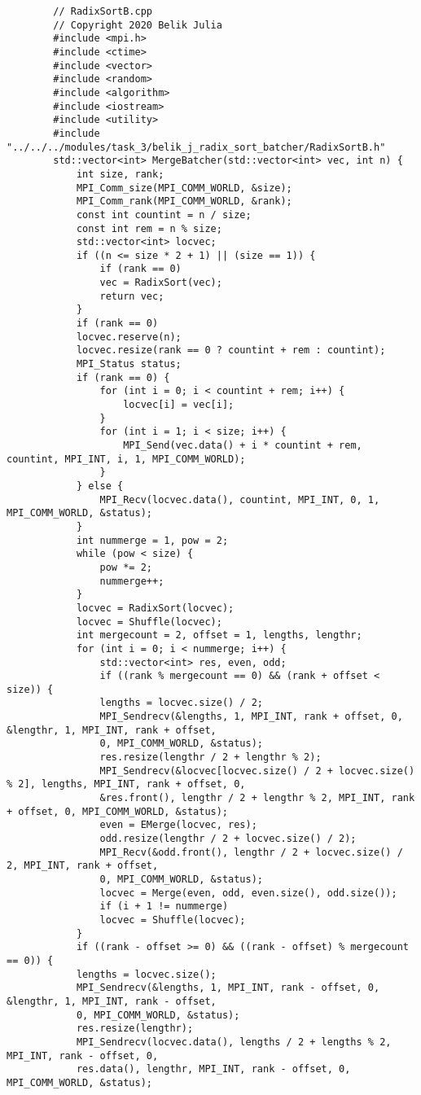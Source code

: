 \documentclass{report}
\begin{document}
	\begin{lstlisting}
		// RadixSortB.cpp
		// Copyright 2020 Belik Julia
		#include <mpi.h>
		#include <ctime>
		#include <vector>
		#include <random>
		#include <algorithm>
		#include <iostream>
		#include <utility>
		#include "../../../modules/task_3/belik_j_radix_sort_batcher/RadixSortB.h"
		std::vector<int> MergeBatcher(std::vector<int> vec, int n) {
			int size, rank;
			MPI_Comm_size(MPI_COMM_WORLD, &size);
			MPI_Comm_rank(MPI_COMM_WORLD, &rank);
			const int countint = n / size;
			const int rem = n % size;
			std::vector<int> locvec;
			if ((n <= size * 2 + 1) || (size == 1)) {
				if (rank == 0)
				vec = RadixSort(vec);
				return vec;
			}
			if (rank == 0)
			locvec.reserve(n);
			locvec.resize(rank == 0 ? countint + rem : countint);
			MPI_Status status;
			if (rank == 0) {
				for (int i = 0; i < countint + rem; i++) {
					locvec[i] = vec[i];
				}
				for (int i = 1; i < size; i++) {
					MPI_Send(vec.data() + i * countint + rem, countint, MPI_INT, i, 1, MPI_COMM_WORLD);
				}
			} else {
				MPI_Recv(locvec.data(), countint, MPI_INT, 0, 1, MPI_COMM_WORLD, &status);
			}
			int nummerge = 1, pow = 2;
			while (pow < size) {
				pow *= 2;
				nummerge++;
			}
			locvec = RadixSort(locvec);
			locvec = Shuffle(locvec);
			int mergecount = 2, offset = 1, lengths, lengthr;
			for (int i = 0; i < nummerge; i++) {
				std::vector<int> res, even, odd;
				if ((rank % mergecount == 0) && (rank + offset < size)) {
				lengths = locvec.size() / 2;
				MPI_Sendrecv(&lengths, 1, MPI_INT, rank + offset, 0, &lengthr, 1, MPI_INT, rank + offset,
				0, MPI_COMM_WORLD, &status);
				res.resize(lengthr / 2 + lengthr % 2);
				MPI_Sendrecv(&locvec[locvec.size() / 2 + locvec.size() % 2], lengths, MPI_INT, rank + offset, 0,
				&res.front(), lengthr / 2 + lengthr % 2, MPI_INT, rank + offset, 0, MPI_COMM_WORLD, &status);
				even = EMerge(locvec, res);
				odd.resize(lengthr / 2 + locvec.size() / 2);
				MPI_Recv(&odd.front(), lengthr / 2 + locvec.size() / 2, MPI_INT, rank + offset,
				0, MPI_COMM_WORLD, &status);
				locvec = Merge(even, odd, even.size(), odd.size());
				if (i + 1 != nummerge)
				locvec = Shuffle(locvec);
			}
			if ((rank - offset >= 0) && ((rank - offset) % mergecount == 0)) {
			lengths = locvec.size();
			MPI_Sendrecv(&lengths, 1, MPI_INT, rank - offset, 0, &lengthr, 1, MPI_INT, rank - offset,
			0, MPI_COMM_WORLD, &status);
			res.resize(lengthr);
			MPI_Sendrecv(locvec.data(), lengths / 2 + lengths % 2, MPI_INT, rank - offset, 0,
			res.data(), lengthr, MPI_INT, rank - offset, 0, MPI_COMM_WORLD, &status);

\end{lstlisting}
\end{document}
